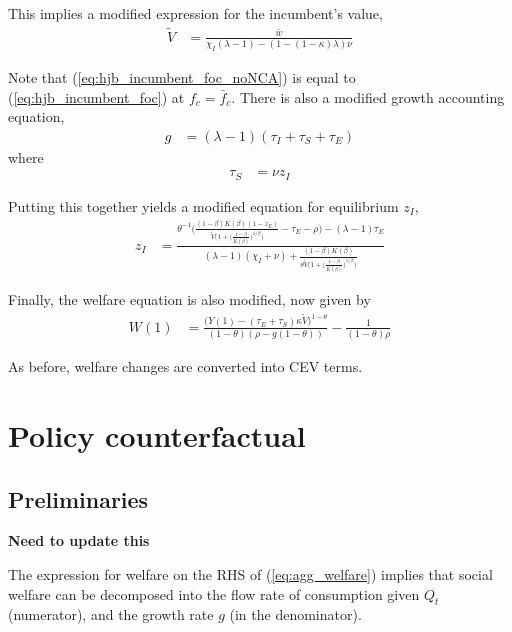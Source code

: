 \documentclass[12pt,english]{article}
\theoremstyle{remark}
\begin{document}
This implies a modified expression for the incumbent's value,
\begin{align}
\tilde{V} &= \frac{\bar{w}}{\chi_I(\lambda - 1) - (1-(1-\kappa)\lambda)\nu} \label{eq:hjb_incumbent_foc_noNCA}
\end{align}

Note that (\ref{eq:hjb_incumbent_foc_noNCA}) is equal to (\ref{eq:hjb_incumbent_foc}) at $f_c = \bar{f}_c$. There is also a modified growth accounting equation,
\begin{align}
g &= (\lambda - 1)(\tau_I + \tau_S + \tau_E) \label{eq:growth_accounting_noNCA}
\end{align}
where
\begin{align}
	\tau_S &= \nu z_I \label{eq:arrival_spinout_noNCA}
\end{align}

Putting this together yields a modified equation for equilibrium $z_I$,
\begin{align}
z_I &= \frac{\theta^{-1}\Bigg( \frac{(1-\beta)K(\beta)(1- z_E)}{\tilde{V}\big(1 + \big(\frac{1-\beta}{K(\beta)}\big)^{1/\beta}\big)} - \tau_E - \rho \Bigg) - (\lambda-1) \tau_E}{(\lambda - 1) (\chi_I + \nu) + \frac{(1-\beta)K(\beta)}{\theta \tilde{V}\big(1 + \big(\frac{1-\beta}{K(\beta)}\big)^{1/\beta}\big)}}  \label{eq:effort_incumbent_noNCA}
\end{align}

Finally, the welfare equation is also modified, now given by 
\begin{align}
W(1) &= \frac{\big(Y(1) - (\tau_E + \tau_S) \kappa \tilde{V}\big)^{1-\theta}}{(1-\theta)(\rho - g(1-\theta))} - \frac{1}{(1-\theta)\rho}  \label{eq:agg_welfare_noNCA}
\end{align}

As before, welfare changes are converted into CEV terms.

\section{Policy counterfactual}

\subsection{Preliminaries}

\textbf{Need to update this}

The expression for welfare on the RHS of (\ref{eq:agg_welfare}) implies that social welfare can be decomposed into the flow rate of consumption given $Q_t$ (numerator), and the growth rate $g$ (in the denominator). 
\end{document}
